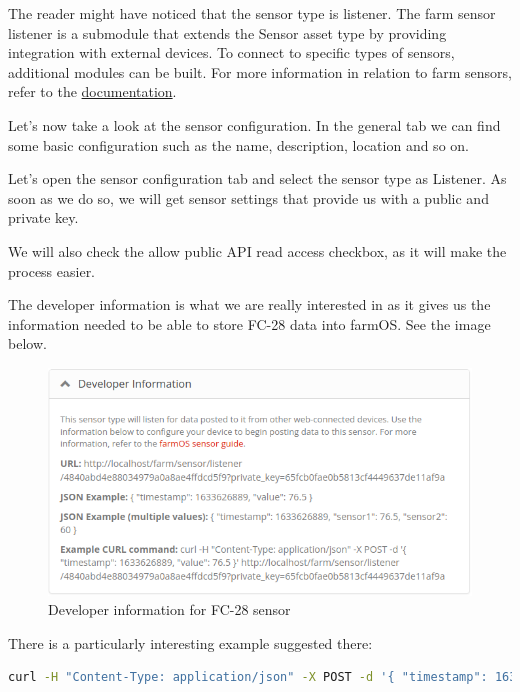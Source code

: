 The reader might have noticed that the sensor type is listener. The farm sensor listener is a submodule that extends the Sensor asset type by providing integration with external devices. To connect to specific types of sensors, additional modules can be built. For more information in relation to farm sensors, refer to the \href{https://farmos.org/guide/assets/sensors/}{documentation}.

Let's now take a look at the sensor configuration. In the general tab we can find some basic configuration such as the name, description, location and so on.

Let's open the sensor configuration tab and select the sensor type as Listener. As soon as we do so, we will get sensor settings that provide us with a public and private key.

We will also check the allow public API read access checkbox, as it will make the process easier.

The developer information is what we are really interested in as it gives us the information needed to be able to store FC-28 data into farmOS. See the image below.

\begin{figure}[H]
    \centering
    \includegraphics[width=1\textwidth]{fig/drupal-install/developer-info.png}
    \caption{Developer information for FC-28 sensor}
    \label{fig:developer-info}
\end{figure}

There is a particularly interesting example suggested there:
\begin{lstlisting}[language=bash]
    curl -H "Content-Type: application/json" -X POST -d '{ "timestamp": 1633626889, "value": 76.5 }' http://localhost/farm/sensor/listener/4840abd4e88034979a0a8ae4ffdcd5f9?private_key=65fcb0fae0b5813cf4449637de11af9a
\end{lstlisting}

